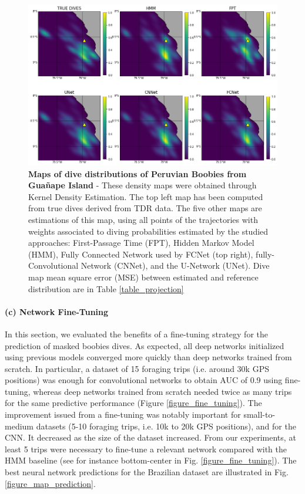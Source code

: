 \documentclass{article}
\begin{document}
\begin{figure}[!h]
  \centering
  \includegraphics[scale=0.5]{figure_map_projection.png}
  \caption{\textbf{Maps of dive distributions of Peruvian Boobies from Guañape Island} - These density maps were obtained through Kernel Density Estimation. The top left map has been computed from true dives derived from TDR data. The five other maps are estimations of this map, using  all points of the trajectories with weights associated to diving probabilities estimated by the studied approaches:  First-Passage Time (FPT), Hidden Markov Model (HMM), Fully Connected Network used by \cite{browning_predicting_2018}  FCNet (top right), fully-Convolutional Network (CNNet), and the U-Network (UNet). Dive map mean square error (MSE) between estimated and reference distribution are in Table \ref{table_projection}}
  \label{figure_map_projection}
\end{figure}


\paragraph{(c) Network Fine-Tuning}
In this section, we evaluated the benefits of a fine-tuning strategy for the prediction of masked boobies dives. As expected, all deep networks initialized using previous models converged more quickly than deep networks trained from scratch. In particular, a dataset of 15 foraging trips (i.e. around 30k GPS positions) was enough for convolutional networks to obtain AUC of 0.9 using fine-tuning, whereas deep networks trained from scratch needed twice as many trips for the same predictive performance (Figure \ref{figure_fine_tuning}). The improvement issued from a fine-tuning was notably important for small-to-medium datasets (5-10 foraging trips, i.e. 10k to 20k GPS positions), and for the CNN. It decreased as the size of the dataset increased. From our experiments, at least 5 trips were necessary to fine-tune a relevant network compared with the HMM baseline (see for instance bottom-center in Fig. \ref{figure_fine_tuning}). The best neural network predictions for the Brazilian dataset are illustrated in Fig. \ref{figure_map_prediction}.
\end{document}
